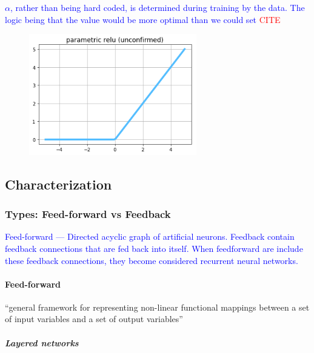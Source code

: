 \textcolor{blue}{$\alpha$, rather than being hard coded, is determined during training by the data. The logic being that the value would be more optimal than we could set \textcolor{red}{CITE}}

\begin{figure}
	\centering
	\includegraphics[width=0.65\textwidth]{./sync_imgs/act/notsmooth/prelu.png}
	\label{fig:act_notsmooth_prelu}
\end{figure}








\subsection{Characterization}

\subsubsection{Types: Feed-forward vs Feedback}

\textcolor{blue}{Feed-forward --- Directed acyclic graph of artificial neurons. Feedback contain feedback connections that are fed back into itself. When feedforward are include these feedback connections, they become considered recurrent neural networks.}

\paragraph{Feed-forward}

\r{``general framework for representing non-linear functional mappings between a set of input variables and a set of output variables''}

\subparagraph{Layered networks}

